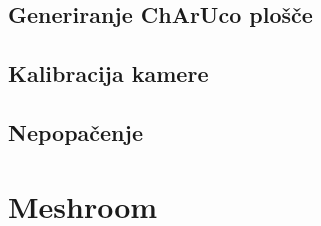 \documentclass[12pt,a4paper,oneside,fleqn]{book}
\begin{document}
    \section{Generiranje ChArUco plošče}
        

    \section{Kalibracija kamere}
        

    \section{Nepopačenje}
        

\chapter{Meshroom}
    


\renewcommand{\thechapter}{}

\end{document}
